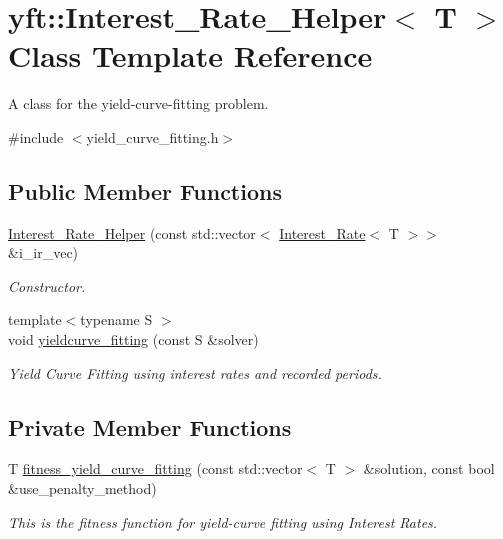 \hypertarget{classyft_1_1_interest___rate___helper}{}\section{yft\+:\+:Interest\+\_\+\+Rate\+\_\+\+Helper$<$ T $>$ Class Template Reference}
\label{classyft_1_1_interest___rate___helper}


A class for the yield-\/curve-\/fitting problem.  




{\ttfamily \#include $<$yield\+\_\+curve\+\_\+fitting.\+h$>$}

\subsection*{Public Member Functions}
\begin{DoxyCompactItemize}
\item 
\hyperlink{classyft_1_1_interest___rate___helper_a153c17e7c5545068f466a8f291e72dc9}{Interest\+\_\+\+Rate\+\_\+\+Helper} (const std\+::vector$<$ \hyperlink{structyft_1_1_interest___rate}{Interest\+\_\+\+Rate}$<$ T $>$$>$ \&i\+\_\+ir\+\_\+vec)
\begin{DoxyCompactList}\small\item\em Constructor. \end{DoxyCompactList}\item 
{\footnotesize template$<$typename S $>$ }\\void \hyperlink{classyft_1_1_interest___rate___helper_a2bf0217c985329f0f32c9df92b29456c}{yieldcurve\+\_\+fitting} (const S \&solver)
\begin{DoxyCompactList}\small\item\em Yield Curve Fitting using interest rates and recorded periods. \end{DoxyCompactList}\end{DoxyCompactItemize}
\subsection*{Private Member Functions}
\begin{DoxyCompactItemize}
\item 
T \hyperlink{classyft_1_1_interest___rate___helper_ab8f50bcc6788356b008716a44dc134b8}{fitness\+\_\+yield\+\_\+curve\+\_\+fitting} (const std\+::vector$<$ T $>$ \&solution, const bool \&use\+\_\+penalty\+\_\+method)
\begin{DoxyCompactList}\small\item\em This is the fitness function for yield-\/curve fitting using Interest Rates. \end{DoxyCompactList}\end{DoxyCompactItemize}
